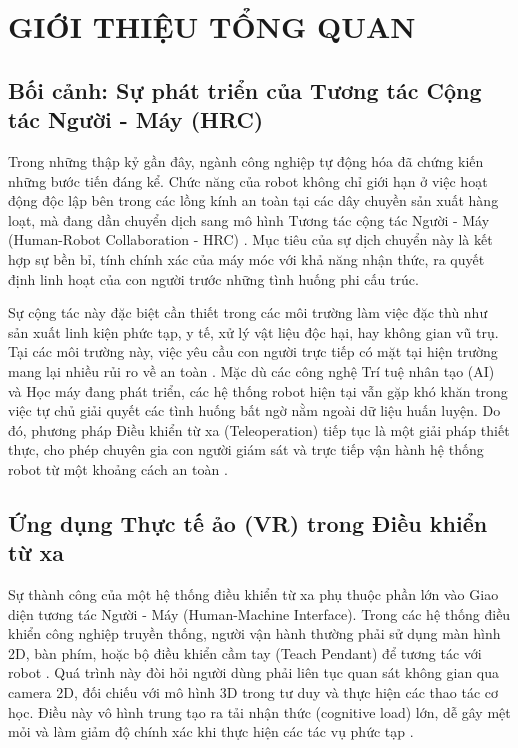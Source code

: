 \chapter{GIỚI THIỆU TỔNG QUAN}
\label{chap:intro}

\section{Bối cảnh: Sự phát triển của Tương tác Cộng tác Người - Máy (HRC)}
Trong những thập kỷ gần đây, ngành công nghiệp tự động hóa đã chứng kiến những bước tiến đáng kể. Chức năng của robot không chỉ giới hạn ở việc hoạt động độc lập bên trong các lồng kính an toàn tại các dây chuyền sản xuất hàng loạt, mà đang dần chuyển dịch sang mô hình Tương tác cộng tác Người - Máy (Human-Robot Collaboration - HRC) \cite{wang2024genealogy}. Mục tiêu của sự dịch chuyển này là kết hợp sự bền bỉ, tính chính xác của máy móc với khả năng nhận thức, ra quyết định linh hoạt của con người trước những tình huống phi cấu trúc.

Sự cộng tác này đặc biệt cần thiết trong các môi trường làm việc đặc thù như sản xuất linh kiện phức tạp, y tế, xử lý vật liệu độc hại, hay không gian vũ trụ. Tại các môi trường này, việc yêu cầu con người trực tiếp có mặt tại hiện trường mang lại nhiều rủi ro về an toàn \cite{autolab2021telesurgery}. Mặc dù các công nghệ Trí tuệ nhân tạo (AI) và Học máy đang phát triển, các hệ thống robot hiện tại vẫn gặp khó khăn trong việc tự chủ giải quyết các tình huống bất ngờ nằm ngoài dữ liệu huấn luyện. Do đó, phương pháp Điều khiển từ xa (Teleoperation) tiếp tục là một giải pháp thiết thực, cho phép chuyên gia con người giám sát và trực tiếp vận hành hệ thống robot từ một khoảng cách an toàn \cite{darvish2023teleoperation}.

\section{Ứng dụng Thực tế ảo (VR) trong Điều khiển từ xa}
Sự thành công của một hệ thống điều khiển từ xa phụ thuộc phần lớn vào Giao diện tương tác Người - Máy (Human-Machine Interface). Trong các hệ thống điều khiển công nghiệp truyền thống, người vận hành thường phải sử dụng màn hình 2D, bàn phím, hoặc bộ điều khiển cầm tay (Teach Pendant) để tương tác với robot \cite{hetrick2020comparing}. Quá trình này đòi hỏi người dùng phải liên tục quan sát không gian qua camera 2D, đối chiếu với mô hình 3D trong tư duy và thực hiện các thao tác cơ học. Điều này vô hình trung tạo ra tải nhận thức (cognitive load) lớn, dễ gây mệt mỏi và làm giảm độ chính xác khi thực hiện các tác vụ phức tạp \cite{chen2023comparing}.

